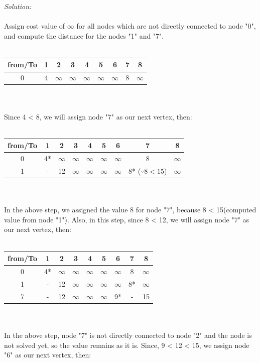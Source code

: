 \textit{Solution:}\\\\
Assign cost value of $\infty$ for all nodes which are not directly connected to node "0", and compute the distance for the nodes "1" and "7".\\\\
\begin{tabular}{c | c| c| c| c| c| c| c| c}
	from/To & 1 & 2 & 3 & 4 & 5 & 6 & 7 & 8 \\
	\hline
	0 & 4 & $\infty$ & $\infty$& $\infty$& $\infty$& $\infty$ & 8 & $\infty$\\
\end{tabular}\\\\
Since 4 < 8, we will assign node "7" as our next vertex, then:\\\\
\begin{tabular}{c | c| c| c| c| c| c| c| c}
	from/To & 1 & 2 & 3 & 4 & 5 & 6 & 7 & 8 \\
	\hline
	0 & 4* & $\infty$ & $\infty$& $\infty$& $\infty$& $\infty$ & 8 & $\infty$\\
	1 & - & 12 & $\infty$& $\infty$& $\infty$& $\infty$ & 8* ($\because 8 < 15$) & $\infty$\\
\end{tabular}\\\\
In the above step, we assigned the value 8 for node "7", because 8 < 15(computed value from node "1"). Also, in this step, since 8 < 12, we will assign node "7" as our next vertex, then:\\\\
\begin{tabular}{c | c| c| c| c| c| c| c| c}
	from/To & 1 & 2 & 3 & 4 & 5 & 6 & 7 & 8 \\
	\hline
	0 & 4* & $\infty$ & $\infty$& $\infty$& $\infty$& $\infty$ & 8 & $\infty$\\
	1 & - & 12 & $\infty$& $\infty$& $\infty$& $\infty$ & 8* & $\infty$\\
	7 & - & 12 & $\infty$& $\infty$& $\infty$& 9* & - & 15\\
\end{tabular}\\\\
In the above step, node "7" is not directly connected to node "2" and the node is not solved yet, so the value remains as it is. Since, 9 < 12 < 15, we assign node "6" as our next vertex, then:\\\\
